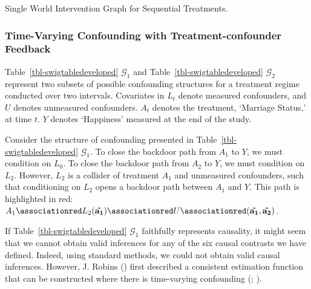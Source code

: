 \documentclass[
  single column]{article}
\begin{document}
\begin{table}

\caption{\label{tbl-swigtabledeveloped}Single World Intervention Graph
for Sequential Treatments.}

\centering{

\swigtabledeveloped

}

\end{table}%

\subsubsection{Time-Varying Confounding with Treatment-confounder
Feedback}\label{time-varying-confounding-with-treatment-confounder-feedback}

Table~\ref{tbl-swigtabledeveloped} \(\mathcal{G}_1\) and
Table~\ref{tbl-swigtabledeveloped} \(\mathcal{G}_2\) represent two
subsets of possible confounding structures for a treatment regime
conducted over two intervals. Covariates in \(L_t\) denote measured
confounders, and \(U\) denotes unmeasured confounders. \(A_t\) denotes
the treatment, `Marriage Status,' at time \(t\). \(Y\) denotes
`Happiness' measured at the end of the study.

Consider the structure of confounding presented in
Table~\ref{tbl-swigtabledeveloped} \(\mathcal{G}_1\). To close the
backdoor path from \(A_1\) to \(Y\), we must condition on \(L_0\). To
close the backdoor path from \(A_2\) to \(Y\), we must condition on
\(L_2\). However, \(L_2\) is a collider of treatment \(A_1\) and
unmeasured confounders, such that conditioning on \(L_2\) opens a
backdoor path between \(A_1\) and \(Y\). This path is highlighted in
red:
\(A_1 \associationred L_2({\mathbf{\tilde{a_1}}}) \associationred U \associationred ({\mathbf{\tilde{a_1}, \tilde{a_2}}})\).

If Table~\ref{tbl-swigtabledeveloped} \(\mathcal{G}_1\) faithfully
represents causality, it might seem that we cannot obtain valid
inferences for any of the six causal contrasts we have defined. Indeed,
using standard methods, we could not obtain valid causal inferences.
However, J. Robins () first described a
consistent estimation function that can be constructed where there is
time-varying confounding (; ).
\end{document}
